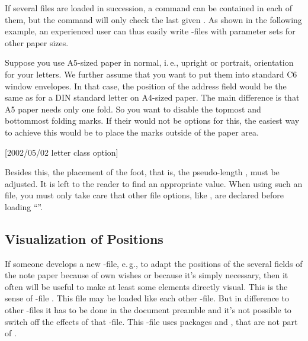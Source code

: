 If several  files are loaded in succession, a
 command can be contained in each of them,
but the  command will only check the last given . As shown in the following example, an experienced user can thus
easily write -files with parameter sets for other paper sizes.
\iffalse%
If you do not plan to set up such \File{lco}-files yourself, you may just
forget about this option and skip the example.%
\fi
\begin{Example}
  Suppose you use A5-sized paper in normal, i.\,e., upright or portrait,
  orientation for your letters. We further assume that you want to put them
  into standard C6 window envelopes. In that case, the position of the address
  field would be the same as for a DIN standard letter on A4-sized paper. The
  main difference is that A5 paper needs only one fold. So you want to disable
  the topmost and bottommost folding marks. If their would not be options for
  this, the easiest way to achieve this would be to place the marks outside of
  the paper area.
\begin{lstcode}
               [2002/05/02 letter class option]
\end{lstcode}
  Besides this, the placement of the foot, that is, the pseudo-length
  , must be adjusted. It is left to the reader to find
  an appropriate value. When using such an  file, you must only take
  care that other  file options, like , are declared before
  loading ``''.
\iffalse%
  Does this seem too complicated?  Only before you have used it the first
  time. Anyway, how often do you write letters not using your standard formats
  for A4-size or letter-size paper?  
\fi%
\end{Example}
%
\EndIndexGroup


\subsection{Visualization of Positions}
\BeginIndexGroup
{}

If someone develops a new -file, e.\,g., to adapt the positions of
the several fields of the note paper because of own wishes or because it's
simply necessary, then it often will be useful to make at least some elements
directly visual. This is the sense of -file
. This file may be
loaded like each other -file. But in difference to other
-files it has to be done in the document preamble and it's not
possible to switch off the effects of that -file. This
-file uses packages %
and , that are not part of
\KOMAScript.


